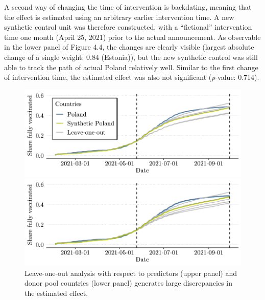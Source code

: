 \documentclass{scrbook}
\begin{document}
A second way of changing the time of intervention is backdating, meaning
that the effect is estimated using an arbitrary earlier intervention
time. A new synthetic control unit was therefore constructed, with a
``fictional'' intervention time one month (April 25, 2021) prior to the
actual announcement. As observable in the lower panel of Figure 4.4, the
changes are clearly visible (largest absolute change of a single weight:
0.84 (Estonia)), but the new synthetic control was still able to track
the path of actual Poland relatively well. Similar to the first change
of intervention time, the estimated effect was also not significant
(\textit{p}-value: 0.714).

\begin{figure}[h]
\caption[Robustness check: Leave-one-out analysis]{Leave-one-out analysis with respect to predictors (upper panel) and donor pool countries (lower panel) generates large discrepancies in the estimated effect.}

\begin{center}\includegraphics{bachelor_thesis_files/figure-latex/unnamed-chunk-6-1} \end{center}



\begin{center}\includegraphics{bachelor_thesis_files/figure-latex/unnamed-chunk-6-2} \end{center}
\end{figure}
\end{document}
